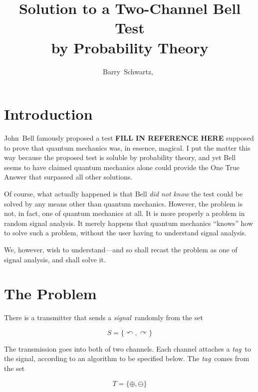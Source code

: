 \documentclass[9pt,technote]{IEEEtran}
\newcommand{\signal}{{\em{signal}}}
\newcommand{\tagg}{{\em{tag}}}
\begin{document}
\title{Solution to a Two-Channel Bell Test\\by Probability Theory}
\author{Barry~Schwartz,~}

\maketitle

\section{Introduction}

John~Bell famously proposed a test {\bf{FILL IN REFERENCE HERE}}
supposed to prove that quantum mechanics was, in essence, magical. I
put the matter this way because the proposed test is soluble by
probability theory, and yet Bell seems to have claimed quantum
mechanics alone could provide the One True Answer that surpassed all
other solutions.

Of course, what actually happened is that Bell {\em{did not know}} the
test could be solved by any means other than quantum
mechanics. However, the problem is not, in fact, one of quantum
mechanics at all. It is more properly a problem in random signal
analysis. It merely happens that quantum mechanics ``knows'' how to
solve such a problem, without the user having to understand signal
analysis.

We, however, wish to understand---and so shall recast the problem as
one of signal analysis, and shall solve it.

\section{The Problem}

There is a transmitter that sends a \signal\ randomly from the set

$$S=\{\curvearrowleft,\curvearrowright\}$$

The transmission goes into both of two channels. Each channel attaches
a \tagg\ to the signal, according to an algorithm to be specified
below. The \tagg\ comes from the set

$$T=\{\oplus,\ominus\}$$
\end{document}
